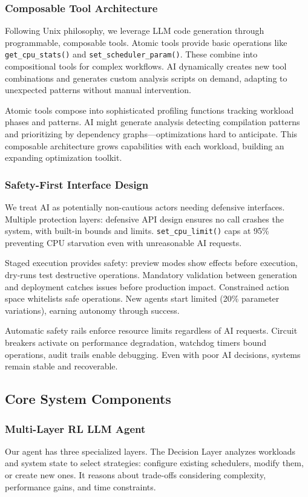 \subsubsection{Composable Tool Architecture}
Following Unix philosophy, we leverage LLM code generation through programmable, composable tools. Atomic tools provide basic operations like \texttt{get\_cpu\_stats()} and \texttt{set\_scheduler\_param()}. These combine into compositional tools for complex workflows. AI dynamically creates new tool combinations and generates custom analysis scripts on demand, adapting to unexpected patterns without manual intervention.

Atomic tools compose into sophisticated profiling functions tracking workload phases and patterns. AI might generate analysis detecting compilation patterns and prioritizing by dependency graphs—optimizations hard to anticipate. This composable architecture grows capabilities with each workload, building an expanding optimization toolkit.

\subsubsection{Safety-First Interface Design}
We treat AI as potentially non-cautious actors needing defensive interfaces. Multiple protection layers: defensive API design ensures no call crashes the system, with built-in bounds and limits. \texttt{set\_cpu\_limit()} caps at 95\% preventing CPU starvation even with unreasonable AI requests.

Staged execution provides safety: preview modes show effects before execution, dry-runs test destructive operations. Mandatory validation between generation and deployment catches issues before production impact. Constrained action space whitelists safe operations. New agents start limited (20\% parameter variations), earning autonomy through success.

Automatic safety rails enforce resource limits regardless of AI requests. Circuit breakers activate on performance degradation, watchdog timers bound operations, audit trails enable debugging. Even with poor AI decisions, systems remain stable and recoverable.

\subsection{Core System Components}

\subsubsection{Multi-Layer RL LLM Agent}
Our agent has three specialized layers. The Decision Layer analyzes workloads and system state to select strategies: configure existing schedulers, modify them, or create new ones. It reasons about trade-offs considering complexity, performance gains, and time constraints.

